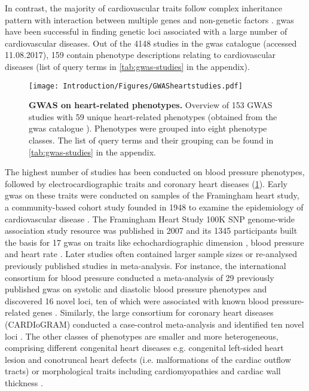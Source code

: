 In contrast, the majority of cardiovascular traits follow complex inheritance pattern with interaction between multiple genes and non-genetic factors \citep{Kathiresan2012}. \gls{gwas} have been successful in finding genetic loci associated with a large number of cardiovascular diseases. Out of the \num{4148} studies in the \gls{gwas} catalogue (accessed 11.08.2017), \num{159} contain phenotype descriptions relating to cardiovascular diseases (list of query terms in \cref{tab:gwas-studies} in the appendix).
\\
\begin{figure}[hbtp]
	\centering
	\texttt{[image: Introduction/Figures/GWASheartstudies.pdf]}
	\caption[\textbf{GWAS on heart-related phenotypes. }]{\textbf{GWAS on heart-related phenotypes. } Overview of \num{153} GWAS studies with \num{59} unique heart-related phenotypes (obtained from the \gls{gwas} catalogue \citep[accessed on 11.08.2017]{MacArthur2017}). Phenotypes were grouped into eight phenotype classes. The list of query terms and their grouping can be found in \cref{tab:gwas-studies} in the appendix.} 
	 	\label{fig:gwas-heart}
\end{figure}

The highest number of studies has been conducted on blood pressure phenotypes, followed by electrocardiographic traits and coronary heart diseases (\cref{fig:gwas-heart}). Early \gls{gwas} on these traits were conducted on samples of the Framingham heart study, a community-based cohort study founded in 1948 to examine the epidemiology of cardiovascular disease \citep{Dawber1951,Kannel1979}. The Framingham Heart Study 100K SNP genome-wide association study resource was published in 2007 \citep{Cupples2007} and its \num{1345} participants built the basis for \num{17} \gls{gwas} on traits like echochardiographic dimension \citep{Vasan2007}, blood pressure \citep{Levy2007} and heart rate \citep{Newton-Cheh2007}. Later studies often contained larger sample sizes or re-analysed previously published studies in meta-analysis. For instance, the international consortium for blood pressure conducted a meta-analysis of \num{29} previously published \gls{gwas} on systolic and diastolic blood pressure phenotypes and discovered \num{16} novel loci, ten of which were associated with known blood pressure-related genes \citep{Ehret2011}. Similarly, the large consortium for coronary heart diseases  (CARDIoGRAM)  conducted a case-control meta-analysis  and identified ten novel loci  \citep{Nikpay2015}. The other classes of phenotypes are smaller and more heterogeneous, comprising different congenital heart diseases e.g. congenital left-sided heart lesion \citep{Mitchell2015,Hanchard2016} and conotruncal heart defects (i.e. malformations of the cardiac outflow tracts) \citep{Agopian2014} or morphological traits including cardiomyopathies \citep{ Villard2011} and cardiac wall thickness \citep{Vasan2009,Arnett2011}. 

